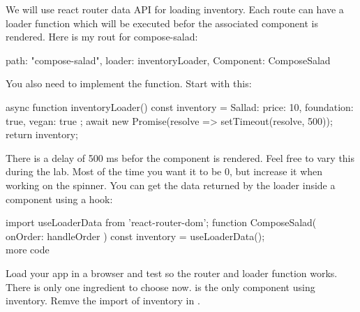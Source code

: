 \documentclass[fleqn, article, a4paper]{memoir}
\begin{document}
\begin{Assignments}
\item We will use react router data API for loading inventory. Each route can have a loader function which will be executed befor the associated component is rendered. Here is my rout for compose-salad:
\begin{Code}
{
  path: "compose-salad",
  loader: inventoryLoader,
  Component: ComposeSalad
}
\end{Code}
You also need to implement the  function. Start with this:
\begin{Code}
async function inventoryLoader() {
  const inventory = { Sallad: { price: 10, foundation: true, vegan: true } };
  await new Promise(resolve => setTimeout(resolve, 500));
  return inventory;
}
\end{Code}
There is a delay of 500 ms befor the component is rendered. Feel free to vary this during the lab. Most of the time you want it to be 0, but increase it when working on the spinner. You can get the data returned by the loader inside a component using a hook:
\begin{Code}
import { useLoaderData } from 'react-router-dom';
function ComposeSalad({ onOrder: handleOrder }) {
  const inventory = useLoaderData();
  \\ more code
}
\end{Code}
Load your app in a browser and test so the router and loader function works. There is only one ingredient to choose now.  is the only component using inventory. Remve the import of {inventory} in .  


\end{Assignments}
\end{document}

